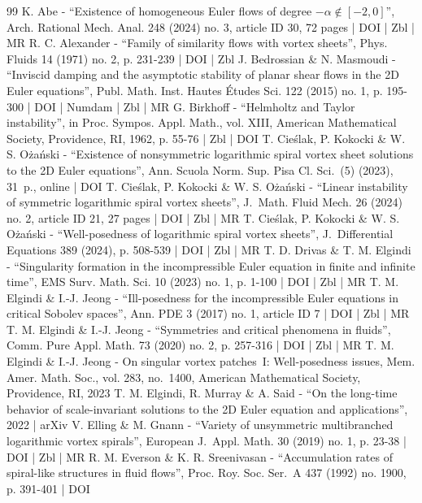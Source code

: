 \documentclass[10pt]{amsart}
\theoremstyle{plain}
\theoremstyle{definition}
\begin{document}
\begin{thebibliography}{99}
K. Abe - “Existence of homogeneous Euler flows of degree $-\alpha \notin [-2,0]$”, Arch. Rational Mech. Anal. 248 (2024) no. 3, article ID 30, 72 pages | DOI | Zbl | MR
R. C. Alexander - “Family of similarity flows with vortex sheets”, Phys. Fluids 14 (1971) no. 2, p. 231-239 | DOI | Zbl
J. Bedrossian \& N. Masmoudi - “Inviscid damping and the asymptotic stability of planar shear flows in the 2D Euler equations”, Publ. Math. Inst. Hautes Études Sci. 122 (2015) no. 1, p. 195-300 | DOI | Numdam | Zbl | MR
G. Birkhoff - “Helmholtz and Taylor instability”, in Proc. Sympos. Appl. Math., vol. XIII, American Mathematical Society, Providence, RI, 1962, p. 55-76 | Zbl | DOI
T. Cieślak, P. Kokocki \& W. S. Ożański - “Existence of nonsymmetric logarithmic spiral vortex sheet solutions to the 2D Euler equations”, Ann. Scuola Norm. Sup. Pisa Cl. Sci. (5) (2023), 31 p., online | DOI
T. Cieślak, P. Kokocki \& W. S. Ożański - “Linear instability of symmetric logarithmic spiral vortex sheets”, J. Math. Fluid Mech. 26 (2024) no. 2, article ID 21, 27 pages | DOI | Zbl | MR
T. Cieślak, P. Kokocki \& W. S. Ożański - “Well-posedness of logarithmic spiral vortex sheets”, J. Differential Equations 389 (2024), p. 508-539 | DOI | Zbl | MR
T. D. Drivas \& T. M. Elgindi - “Singularity formation in the incompressible Euler equation in finite and infinite time”, EMS Surv. Math. Sci. 10 (2023) no. 1, p. 1-100 | DOI | Zbl | MR
T. M. Elgindi \& I.-J. Jeong - “Ill-posedness for the incompressible Euler equations in critical Sobolev spaces”, Ann. PDE 3 (2017) no. 1, article ID 7 | DOI | Zbl | MR
T. M. Elgindi \& I.-J. Jeong - “Symmetries and critical phenomena in fluids”, Comm. Pure Appl. Math. 73 (2020) no. 2, p. 257-316 | DOI | Zbl | MR
T. M. Elgindi \& I.-J. Jeong - On singular vortex patches I: Well-posedness issues, Mem. Amer. Math. Soc., vol. 283, no. 1400, American Mathematical Society, Providence, RI, 2023
T. M. Elgindi, R. Murray \& A. Said - “On the long-time behavior of scale-invariant solutions to the 2D Euler equation and applications”, 2022 | arXiv
V. Elling \& M. Gnann - “Variety of unsymmetric multibranched logarithmic vortex spirals”, European J. Appl. Math. 30 (2019) no. 1, p. 23-38 | DOI | Zbl | MR
R. M. Everson \& K. R. Sreenivasan - “Accumulation rates of spiral-like structures in fluid flows”, Proc. Roy. Soc. Ser. A 437 (1992) no. 1900, p. 391-401 | DOI

\end{thebibliography}
\end{document}
